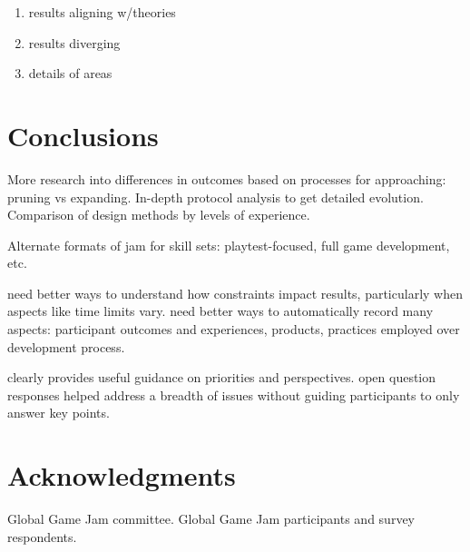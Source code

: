 \documentclass{sig-alternate}
\begin{document}
\begin{enumerate}
\item results aligning w/theories
\item results diverging
\item details of areas
\end{enumerate}

\section{Conclusions}
More research into differences in outcomes based on processes for approaching: pruning vs expanding. In-depth protocol analysis to get detailed evolution. Comparison of design methods by levels of experience.

Alternate formats of jam for skill sets: playtest-focused, full game development, etc.

need better ways to understand how constraints impact results, particularly when aspects like time limits vary. need better ways to automatically record many aspects: participant outcomes and experiences, products, practices employed over development process.

clearly provides useful guidance on priorities and perspectives. open question responses helped address a breadth of issues without guiding participants to only answer key points.

\section{Acknowledgments}
Global Game Jam committee. Global Game Jam participants and survey respondents.








\appendix
{}
\end{document}
